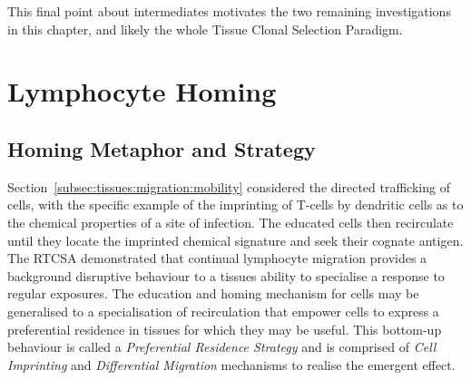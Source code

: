 This final point about intermediates motivates the two remaining investigations in this chapter, and likely the whole Tissue Clonal Selection Paradigm.

%
%
\section{Lymphocyte Homing}
\label{sec:tissues:homing}

%
%
\subsection{Homing Metaphor and Strategy}
Section~\ref{subsec:tissues:migration:mobility} considered the directed trafficking of cells, with the specific example of the imprinting of T-cells by dendritic cells as to the chemical properties of a site of infection. The educated cells then recirculate until they locate the imprinted chemical signature and seek their cognate antigen.
The RTCSA demonstrated that continual lymphocyte migration provides a background disruptive behaviour to a tissues ability to specialise a response to regular exposures. The education and homing mechanism for cells may be generalised to a specialisation of recirculation that empower cells to express a preferential residence in tissues for which they may be useful. This bottom-up behaviour is called a \emph{Preferential Residence Strategy} and is comprised of \emph{Cell Imprinting} and \emph{Differential Migration} mechanisms to realise the emergent effect.


